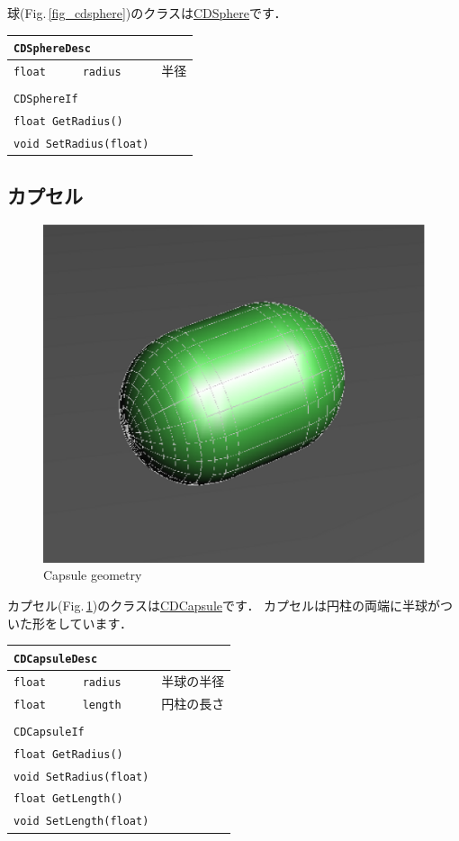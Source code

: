\KLUDGE 球(Fig.\,\ref{fig_cdsphere})\KLUDGE のクラスは\url{CDSphere}\KLUDGE です．

\begin{center}
\begin{tabular}{lll}
\multicolumn{3}{l}{\texttt{CDSphereDesc}}				\\ \midrule
\texttt{float}	&	\texttt{radius}	& \KLUDGE 半径 				\\
\\
\multicolumn{3}{l}{\texttt{CDSphereIf}}					\\ \midrule
\multicolumn{2}{l}{\texttt{float GetRadius()}}			\\
\multicolumn{2}{l}{\texttt{void SetRadius(float)}}		\\
\end{tabular}
\end{center}


\subsection*{\KLUDGE カプセル}

\begin{figure}[t]
\begin{center}
\includegraphics[width=.4\hsize]{fig/cdcapsule.eps}
\end{center}
\caption{Capsule geometry}
\label{fig_cdcapsule}
\end{figure}

\KLUDGE カプセル(Fig.\,\ref{fig_cdcapsule})\KLUDGE のクラスは\url{CDCapsule}\KLUDGE です．
\KLUDGE カプセルは円柱の両端に半球がついた形をしています．

\begin{center}
\begin{tabular}{lll}
\multicolumn{3}{l}{\texttt{CDCapsuleDesc}}				\\ \midrule
\texttt{float}	&	\texttt{radius}	& \KLUDGE 半球の半径 		\\
\texttt{float}	&	\texttt{length} & \KLUDGE 円柱の長さ		\\
\\
\multicolumn{3}{l}{\texttt{CDCapsuleIf}}				\\ \midrule
\multicolumn{2}{l}{\texttt{float GetRadius()}}			\\
\multicolumn{2}{l}{\texttt{void SetRadius(float)}}		\\
\multicolumn{2}{l}{\texttt{float GetLength()}}			\\
\multicolumn{2}{l}{\texttt{void SetLength(float)}}		\\
\end{tabular}
\end{center}


